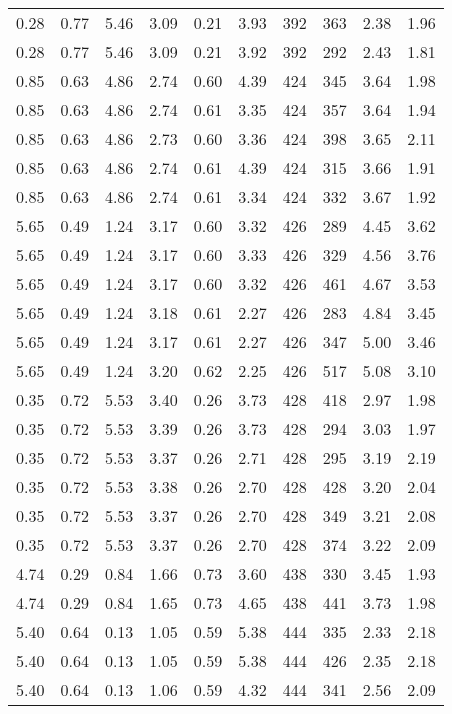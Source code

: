 \begin{longtable}{rrrrrrrrrr}
0.28	&	0.77	&	5.46	&	3.09	&	0.21	&	3.93	&	392	&	363	&	2.38	&	1.96	\\
0.28	&	0.77	&	5.46	&	3.09	&	0.21	&	3.92	&	392	&	292	&	2.43	&	1.81	\\
0.85	&	0.63	&	4.86	&	2.74	&	0.60	&	4.39	&	424	&	345	&	3.64	&	1.98	\\
0.85	&	0.63	&	4.86	&	2.74	&	0.61	&	3.35	&	424	&	357	&	3.64	&	1.94	\\
0.85	&	0.63	&	4.86	&	2.73	&	0.60	&	3.36	&	424	&	398	&	3.65	&	2.11	\\
0.85	&	0.63	&	4.86	&	2.74	&	0.61	&	4.39	&	424	&	315	&	3.66	&	1.91	\\
0.85	&	0.63	&	4.86	&	2.74	&	0.61	&	3.34	&	424	&	332	&	3.67	&	1.92	\\
5.65	&	0.49	&	1.24	&	3.17	&	0.60	&	3.32	&	426	&	289	&	4.45	&	3.62	\\
5.65	&	0.49	&	1.24	&	3.17	&	0.60	&	3.33	&	426	&	329	&	4.56	&	3.76	\\
5.65	&	0.49	&	1.24	&	3.17	&	0.60	&	3.32	&	426	&	461	&	4.67	&	3.53	\\
5.65	&	0.49	&	1.24	&	3.18	&	0.61	&	2.27	&	426	&	283	&	4.84	&	3.45	\\
5.65	&	0.49	&	1.24	&	3.17	&	0.61	&	2.27	&	426	&	347	&	5.00	&	3.46	\\
5.65	&	0.49	&	1.24	&	3.20	&	0.62	&	2.25	&	426	&	517	&	5.08	&	3.10	\\
0.35	&	0.72	&	5.53	&	3.40	&	0.26	&	3.73	&	428	&	418	&	2.97	&	1.98	\\
0.35	&	0.72	&	5.53	&	3.39	&	0.26	&	3.73	&	428	&	294	&	3.03	&	1.97	\\
0.35	&	0.72	&	5.53	&	3.37	&	0.26	&	2.71	&	428	&	295	&	3.19	&	2.19	\\
0.35	&	0.72	&	5.53	&	3.38	&	0.26	&	2.70	&	428	&	428	&	3.20	&	2.04	\\
0.35	&	0.72	&	5.53	&	3.37	&	0.26	&	2.70	&	428	&	349	&	3.21	&	2.08	\\
0.35	&	0.72	&	5.53	&	3.37	&	0.26	&	2.70	&	428	&	374	&	3.22	&	2.09	\\
4.74	&	0.29	&	0.84	&	1.66	&	0.73	&	3.60	&	438	&	330	&	3.45	&	1.93	\\
4.74	&	0.29	&	0.84	&	1.65	&	0.73	&	4.65	&	438	&	441	&	3.73	&	1.98	\\
5.40	&	0.64	&	0.13	&	1.05	&	0.59	&	5.38	&	444	&	335	&	2.33	&	2.18	\\
5.40	&	0.64	&	0.13	&	1.05	&	0.59	&	5.38	&	444	&	426	&	2.35	&	2.18	\\
5.40	&	0.64	&	0.13	&	1.06	&	0.59	&	4.32	&	444	&	341	&	2.56	&	2.09	\\

\end{longtable}
